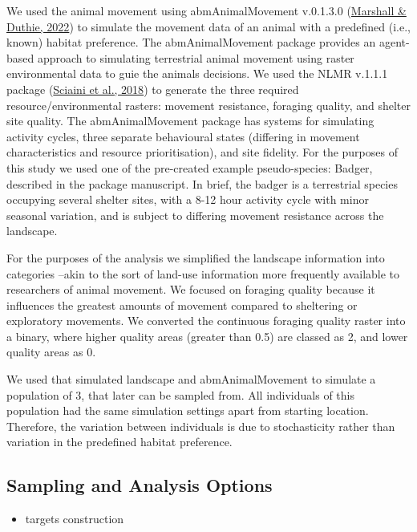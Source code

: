 \documentclass[10pt,a4paper]{article}
\providecommand{\tightlist}{%
  \setlength{\itemsep}{0pt}\setlength{\parskip}{0pt}}
\begin{document}
We used the animal movement using abmAnimalMovement v.0.1.3.0 (\protect\hyperlink{ref-abmAnimalMovement}{Marshall \& Duthie, 2022}) to simulate the movement data of an animal with a predefined (i.e., known) habitat preference.
The abmAnimalMovement package provides an agent-based approach to simulating terrestrial animal movement using raster environmental data to guie the animals decisions.
We used the NLMR v.1.1.1 package (\protect\hyperlink{ref-NLMR}{Sciaini et al., 2018}) to generate the three required resource/environmental rasters: movement resistance, foraging quality, and shelter site quality.
The abmAnimalMovement package has systems for simulating activity cycles, three separate behavioural states (differing in movement characteristics and resource prioritisation), and site fidelity.
For the purposes of this study we used one of the pre-created example pseudo-species: Badger, described in the package manuscript.
In brief, the badger is a terrestrial species occupying several shelter sites, with a 8-12 hour activity cycle with minor seasonal variation, and is subject to differing movement resistance across the landscape.

For the purposes of the analysis we simplified the landscape information into categories --akin to the sort of land-use information more frequently available to researchers of animal movement.
We focused on foraging quality because it influences the greatest amounts of movement compared to sheltering or exploratory movements.
We converted the continuous foraging quality raster into a binary, where higher quality areas (greater than 0.5) are classed as 2, and lower quality areas as 0.

We used that simulated landscape and abmAnimalMovement to simulate a population of 3, that later can be sampled from.
All individuals of this population had the same simulation settings apart from starting location.
Therefore, the variation between individuals is due to stochasticity rather than variation in the predefined habitat preference.

\hypertarget{sampling-and-analysis-options}{%
\subsection{Sampling and Analysis Options}\label{sampling-and-analysis-options}}

\begin{itemize}
\tightlist
\item
  targets construction
\end{itemize}
\end{document}
